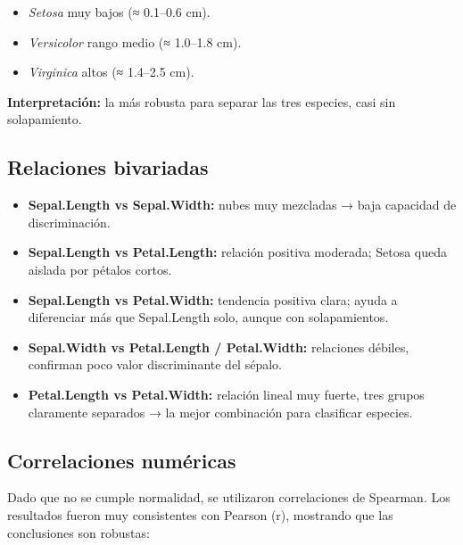 \documentclass[
  spanish,
  11pt,
  a4paper,
  DIV=11,
  numbers=noendperiod]{scrartcl}
\providecommand{\tightlist}{%
  \setlength{\itemsep}{0pt}\setlength{\parskip}{0pt}}
\begin{document}
\begin{itemize}
  \begin{itemize}
  \tightlist
  \item
    \emph{Setosa} muy bajos (≈ 0.1--0.6 cm).\\
  \item
    \emph{Versicolor} rango medio (≈ 1.0--1.8 cm).\\
  \item
    \emph{Virginica} altos (≈ 1.4--2.5 cm).
  \end{itemize}

  \textbf{Interpretación:} la más robusta para separar las tres
  especies, casi sin solapamiento.
\end{itemize}

\subsection{Relaciones bivariadas}\label{relaciones-bivariadas}

\begin{itemize}
\tightlist
\item
  \textbf{Sepal.Length vs Sepal.Width:} nubes muy mezcladas → baja
  capacidad de discriminación.\\
\item
  \textbf{Sepal.Length vs Petal.Length:} relación positiva moderada;
  Setosa queda aislada por pétalos cortos.\\
\item
  \textbf{Sepal.Length vs Petal.Width:} tendencia positiva clara; ayuda
  a diferenciar más que Sepal.Length solo, aunque con solapamientos.\\
\item
  \textbf{Sepal.Width vs Petal.Length / Petal.Width:} relaciones
  débiles, confirman poco valor discriminante del sépalo.\\
\item
  \textbf{Petal.Length vs Petal.Width:} relación lineal muy fuerte, tres
  grupos claramente separados → la mejor combinación para clasificar
  especies.
\end{itemize}

\subsection{Correlaciones numéricas}\label{correlaciones-numuxe9ricas}

Dado que no se cumple normalidad, se utilizaron correlaciones de
Spearman. Los resultados fueron muy consistentes con Pearson (r),
mostrando que las conclusiones son robustas:
\end{document}
